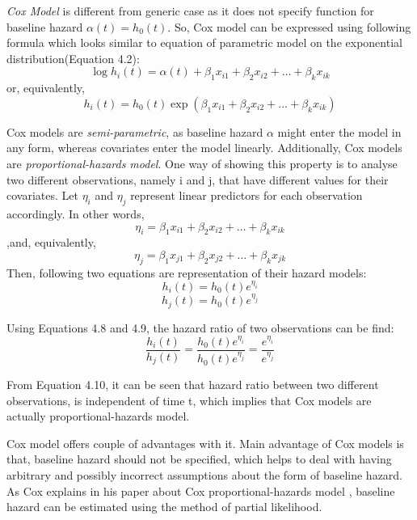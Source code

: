 \documentclass{ba-kecs}
\numberwithin{figure}{section}
\numberwithin{equation}{section}
\begin{document}
\textit{Cox Model} is different from generic case as it does not specify function for baseline hazard $\alpha(t) = h_{0}(t)$. So, Cox model can be expressed using following formula which looks similar to equation of parametric model on the exponential distribution(Equation 4.2):
\begin{equation}
\log{h_{i}(t)} = \alpha(t) + \beta_{1}x_{i1} + \beta_{2}x_{i2} + \hdots + \beta_{k}x_{ik}
\end{equation}
or, equivalently,
\begin{equation}
h_{i}(t) = h_{0}(t)\exp(\beta_{1}x_{i1} + \beta_{2}x_{i2} + \hdots + \beta_{k}x_{ik})
\end{equation}

Cox models are \textit{semi-parametric}, as baseline hazard $\alpha$ might enter the model in any form, whereas covariates enter the model linearly. Additionally, Cox models are \textit{proportional-hazards model}. One way of showing this property is to analyse two different observations, namely i and j, that have different values for their covariates. Let $\eta_{i}$ and $\eta_{j}$ represent linear predictors for each observation accordingly. In other words,
\begin{equation}
\eta_{i} = \beta_{1}x_{i1} + \beta_{2}x_{i2} + \hdots + \beta_{k}x_{ik}
\end{equation}
,and, equivalently,
\begin{equation}
\eta_{j} = \beta_{1}x_{j1} + \beta_{2}x_{j2} + \hdots + \beta_{k}x_{jk}
\end{equation}
Then, following two equations are representation of their hazard models:
\begin{equation}
h_{i}(t) = h_{0}(t)e^{\eta_{i}}
\end{equation}
\begin{equation}
h_{j}(t) = h_{0}(t)e^{\eta_{j}}
\end{equation}

Using Equations 4.8 and 4.9, the hazard ratio of two observations can be find:
\begin{equation}
\dfrac{h_{i}(t)}{h_{j}(t)} = \dfrac{h_{0}(t)e^{\eta_{i}}}{h_{0}(t)e^{\eta_{j}}} = \dfrac{e^{\eta_{i}}}{e^{\eta_{j}}}
\end{equation}

From Equation 4.10, it can be seen that hazard ratio between two different observations, is independent of time t, which implies that Cox models are actually proportional-hazards model.

Cox model offers couple of advantages with it. Main advantage of Cox models is that, baseline hazard should not be specified, which helps to deal with having arbitrary and possibly incorrect assumptions about the form of baseline hazard. As Cox explains in his paper about Cox proportional-hazards model \cite{coxoriginal}, baseline hazard can be estimated using the method of partial likelihood.
\end{document}
